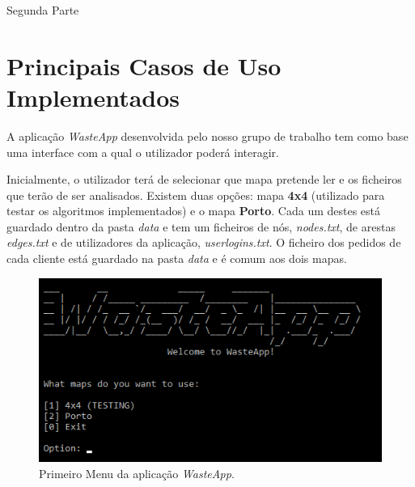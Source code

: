 \documentclass[article, a4paper, 12pt, oneside]{memoir}
\begin{document}
\newpage
\thispagestyle{plain}

\begin{center}
\LARGE Segunda Parte
\end{center}

\newpage
\chapter[Principais Casos de Uso Implementados][Principais Casos de Uso Implementados]{Principais Casos de Uso Implementados} \label{\thechapter}

A aplicação \textit{WasteApp} desenvolvida pelo nosso grupo de trabalho tem como base uma interface com a qual o utilizador poderá interagir. 

Inicialmente, o utilizador terá de selecionar que mapa pretende ler e os ficheiros que terão de ser analisados. Existem duas opções: mapa \textbf{4x4} (utilizado para testar os algoritmos implementados) e o mapa \textbf{Porto}. Cada um destes está guardado dentro da pasta \textit{data} e tem um ficheiros de nós, \textit{nodes.txt}, de arestas \textit{edges.txt} e de utilizadores da aplicação, \textit{userlogins.txt}. O ficheiro dos pedidos de cada cliente está guardado na pasta \textit{data} e é comum aos dois mapas. 

\begin{figure}[h!]
  \centerline{\includegraphics[scale=0.8]{wasteapp_1stmenu.png}}
  \caption{Primeiro Menu da aplicação \textit{WasteApp}.}
\end{figure}
\end{document}
